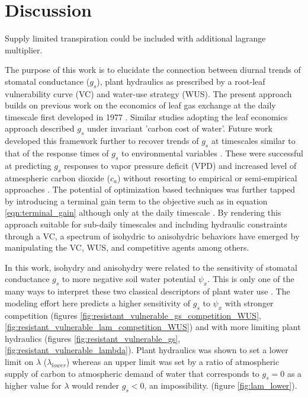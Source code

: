 \documentclass[utf8]{frontiersSCNS} %
\begin{document}
\section{Discussion}

Supply limited transpiration could be included with additional lagrange multiplier.

The purpose of this work is to elucidate the connection between diurnal trends of stomatal conductance ($g_s$), plant hydraulics as prescribed by a root-leaf vulnerability curve (VC) and water-use strategy (WUS). The present approach builds on previous work on the economics of leaf gas exchange at the daily timescale first developed in 1977 \citep{cowan1977, cowan1978stomatal}. Similar studies adopting the leaf economics approach described $g_s$ under invariant 'carbon cost of water'. Future work developed this framework further to recover trends of $g_s$ at timescales similar to that of the response times of $g_s$ to environmental variables \citep{Katul2009, Katul2009a}. These were successful at predicting $g_s$ responses to vapor pressure deficit (VPD) and increased level of atmespheric carbon dioxide ($c_a$) without resorting to empirical or semi-empirical approaches \citep{jarvis1976interpretation, collatz1991physiological, leuning1995critical}. The potential of optimization based techniques was further tapped by introducing a terminal gain term to the objective such as in  equation \ref{eqn:terminal_gain} although only at the daily timescale \citep{Manzoni2013}. By rendering this approach suitable for sub-daily timescales and including hydraulic constraints through a VC, a spectrum of isohydric to anisohydric behaviors have emerged by manipulating the VC, WUS, and competitive agents among others.

In this work, isohydry and anisohydry were related to the sensitivity of stomatal conductance $g_s$ to more negative soil water potential $\psi_x$. This is only one of the many ways to interpret these two classical descriptors of plant water use \citep{Hochberg2017}. The modeling effort here predicts a higher sensitivity of $g_s$ to $\psi_x$ with stronger competition (figures \ref{fig:resistant_vulnerable_gs_competition_WUS}, \ref{fig:resistant_vulnerable_lam_competition_WUS}) and with more limiting plant hydraulics (figures \ref{fig:resistant_vulnerable_gs}, \ref{fig:resistant_vulnerable_lambda}). Plant hydraulics was shown to set a lower limit on $\lambda$ ($\lambda_{lower}$) whereas an upper limit was set by a ratio of atmospheric supply of carbon to atmospheric demand of water that corresponds to $g_s=0$ as a higher value for $\lambda$ would render $g_s<0$, an impossibility. (figure \ref{fig:lam_lower}).
 
\end{document}
